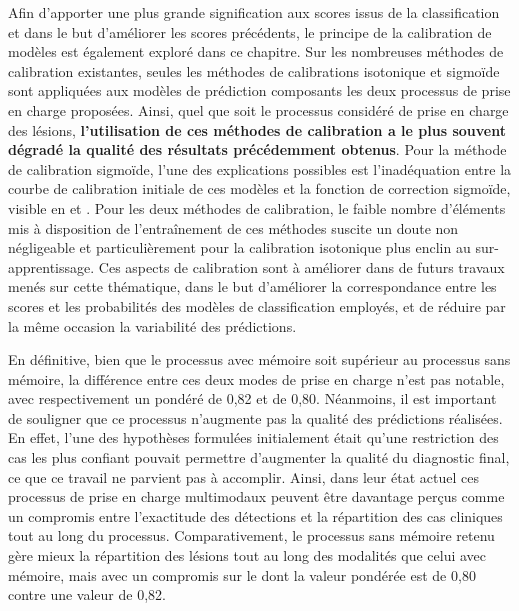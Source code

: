 Afin d'apporter une plus grande signification aux scores issus de la classification et dans le but d'améliorer les scores précédents, le principe de la calibration de modèles est également exploré dans ce chapitre. Sur les nombreuses méthodes de calibration existantes, seules les méthodes de calibrations isotonique et sigmoïde sont appliquées aux modèles de prédiction composants les deux processus de prise en charge proposées. Ainsi, quel que soit le processus considéré de prise en charge des lésions, \textbf{l'utilisation de ces méthodes de calibration a le plus souvent dégradé la qualité des résultats précédemment obtenus}. Pour la méthode de calibration sigmoïde, l'une des explications possibles est l'inadéquation entre la courbe de calibration initiale de ces modèles et la fonction de correction sigmoïde, visible en  et . Pour les deux méthodes de calibration, le faible nombre d'éléments mis à disposition de l'entraînement de ces méthodes suscite un doute non négligeable et particulièrement pour la calibration isotonique plus enclin au sur-apprentissage. Ces aspects de calibration sont à améliorer dans de futurs travaux menés sur cette thématique, dans le but d'améliorer la correspondance entre les scores et les probabilités des modèles de classification employés, et de réduire par la même occasion la variabilité des prédictions.\par

En définitive, bien que le processus avec mémoire soit supérieur au processus sans mémoire, la différence entre ces deux modes de prise en charge n'est pas notable, avec respectivement un \fscore{} pondéré de 0,82 et de 0,80. Néanmoins, il est important de souligner que ce processus n'augmente pas la qualité des prédictions réalisées. En effet, l'une des hypothèses formulées initialement était qu'une restriction des cas les plus confiant pouvait permettre d'augmenter la qualité du diagnostic final, ce que ce travail ne parvient pas à accomplir. Ainsi, dans leur état actuel ces processus de prise en charge multimodaux peuvent être davantage perçus comme un compromis entre l'exactitude des détections et la répartition des cas cliniques tout au long du processus. Comparativement, le processus sans mémoire retenu gère mieux la répartition des lésions tout au long des modalités que celui avec mémoire, mais avec un compromis sur le \fscore{} dont la valeur pondérée est de 0,80 contre une valeur de 0,82.\par

